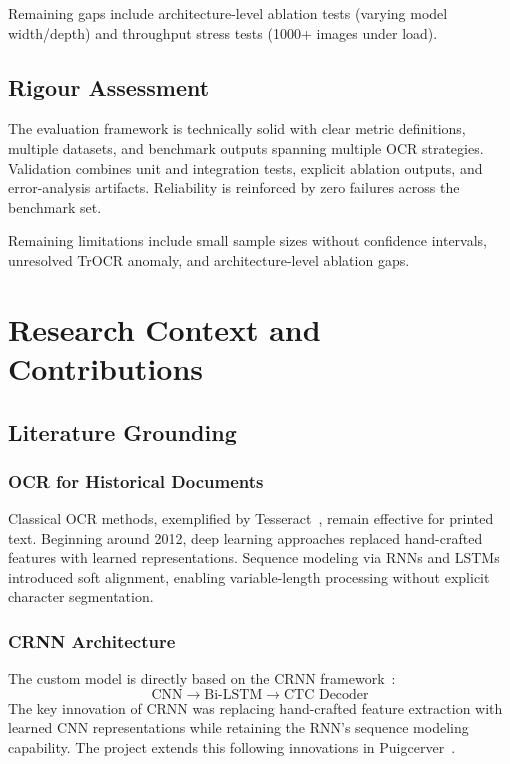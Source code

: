 \documentclass[12pt,a4paper]{article}
\begin{document}
Remaining gaps include architecture-level ablation tests (varying
model width/depth) and throughput stress tests (1000+ images under
load).

\subsection{Rigour Assessment}

The evaluation framework is technically solid with clear metric
definitions, multiple datasets, and benchmark outputs spanning
multiple OCR strategies. Validation combines unit and integration
tests, explicit ablation outputs, and error-analysis artifacts.
Reliability is reinforced by zero failures across the benchmark set.

Remaining limitations include small sample sizes without confidence
intervals, unresolved TrOCR anomaly, and architecture-level ablation
gaps.

\newpage

\section{Research Context and Contributions}

\subsection{Literature Grounding}

\subsubsection{OCR for Historical Documents}

Classical OCR methods, exemplified by Tesseract~\cite{ref:smith2007},
remain effective for printed text. Beginning around 2012, deep
learning approaches replaced hand-crafted features with learned
representations. Sequence modeling via RNNs and LSTMs introduced
soft alignment, enabling variable-length processing without explicit
character segmentation.

\subsubsection{CRNN Architecture}

The custom model is directly based on the CRNN
framework~\cite{ref:shi2015}:
\[
  \text{CNN} \rightarrow \text{Bi-LSTM} \rightarrow
  \text{CTC Decoder}
\]
The key innovation of CRNN was replacing hand-crafted feature
extraction with learned CNN representations while retaining the
RNN's sequence modeling capability. The project extends this
following innovations in Puigcerver~\cite{ref:puigcerver2017}.
\end{document}
